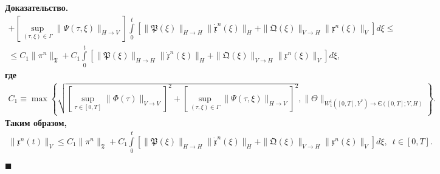 \documentclass{report}
\newenvironment{Proof}{\par\noindent\bf Доказательство.\rm}{ $\blacksquare$\par}
\begin{document}
\begin{Proof}
\begin{gather*}
+[\sup\limits_{(\tau,\xi)\in\Gamma}\|\Psi(\tau,\xi)\|_{H\to V}]\int\limits_0^t[\|\mathfrak{P}(\xi)\|_{H\to H}\|\dot{\mathfrak{x}}^n(\xi)\|_H + \|\mathfrak{Q}(\xi)\|_{V\to H}\|{\mathfrak{x}}^n(\xi)\|_V]d\xi\leqslant\\
\leqslant C_1\|\pi^n\|_{\mathfrak{T}}+C_1\int\limits_0^t[\|\mathfrak{P}(\xi)\|_{H\to H}\|\dot{\mathfrak{x}}^n(\xi)\|_H + \|\mathfrak{Q}(\xi)\|_{V\to H}\|{\mathfrak{x}}^n(\xi)\|_V]d\xi,
\end{gather*}
где
\begin{gather*}
C_1\equiv\max\left\{\sqrt{[\sup\limits_{\tau\in[0,T]}\|\Phi(\tau)\|_{V\to V}]^2+[\sup\limits_{(\tau,\xi)\in\Gamma}\|\Psi(\tau,\xi)\|_{H\to V}]^2},\|\Theta\|_{W^1_1([0,T],Y^*)\to{\textrm{Є}}{}([0,T];V,H)}\right\}.
\end{gather*}
Таким образом,
\begin{gather}\label{norm.of(x.n(t)).in.V.estimate}
\|\mathfrak{x}^n(t)\|_V\leqslant C_1\|\pi^n\|_{\mathfrak{T}}+C_1\int\limits_0^t[\|\mathfrak{P}(\xi)\|_{H\to H}\|\dot{\mathfrak{x}}^n(\xi)\|_H + \|\mathfrak{Q}(\xi)\|_{V\to H}\|{\mathfrak{x}}^n(\xi)\|_V]d\xi,\,\,\,t\in[0,T].
\end{gather}


\end{Proof}
\end{document}

